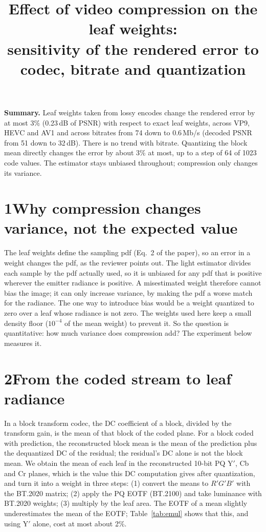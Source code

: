 \documentclass[10pt]{article}
\title{\vspace{-1.6em}Effect of video compression on the leaf weights:\\ sensitivity of the rendered error to codec, bitrate and quantization}
\author{}
\date{\vspace{-2.4em}}
\begin{document}
\maketitle
\vspace{-1.0em}

\textbf{Summary.} Leaf weights taken from lossy encodes change the rendered error by at most 3\% (0.23\,dB of PSNR) with respect to exact leaf weights, across VP9, HEVC and AV1 and across bitrates from 74 down to 0.6\,Mb/s (decoded PSNR from 51 down to 32\,dB). There is no trend with bitrate. Quantizing the block mean directly changes the error by about 3\% at most, up to a step of 64 of 1023 code values. The estimator stays unbiased throughout; compression only changes its variance.

\section*{1\quad Why compression changes variance, not the expected value}

The leaf weights define the sampling pdf (Eq.~2 of the paper), so an error in a weight changes the pdf, as the reviewer points out. The light estimator divides each sample by the pdf actually used, so it is unbiased for any pdf that is positive wherever the emitter radiance is positive. A misestimated weight therefore cannot bias the image; it can only increase variance, by making the pdf a worse match for the radiance. The one way to introduce bias would be a weight quantized to zero over a leaf whose radiance is not zero. The weights used here keep a small density floor ($10^{-4}$ of the mean weight) to prevent it. So the question is quantitative: how much variance does compression add? The experiment below measures it.

\section*{2\quad From the coded stream to leaf radiance}

In a block transform codec, the DC coefficient of a block, divided by the transform gain, is the mean of that block of the coded plane. For a block coded with prediction, the reconstructed block mean is the mean of the prediction plus the dequantized DC of the residual; the residual's DC alone is not the block mean. We obtain the mean of each leaf in the reconstructed 10-bit PQ Y$'$, Cb and Cr planes, which is the value this DC computation gives after quantization, and turn it into a weight in three steps: (1) convert the means to $R'G'B'$ with the BT.2020 matrix; (2) apply the PQ EOTF (BT.2100) and take luminance with BT.2020 weights; (3) multiply by the leaf area. The EOTF of a mean slightly underestimates the mean of the EOTF; Table~\ref{tab:emul} shows that this, and using Y$'$ alone, cost at most about 2\%.
\end{document}
